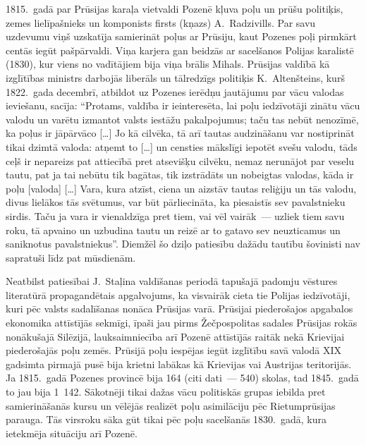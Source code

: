 \documentclass[twoside,a5paper,12pt,fleqn,openany]{extbook}
\newcommand{\citespace}{[\dots{}]}
\begin{document}
1815.~gadā par Prūsijas karaļa vietvaldi Pozenē kļuva poļu un prūšu politiķis, zemes lielīpašnieks un komponists firsts (kņazs) A.~Radzivills. Par savu uzdevumu viņš uzskatīja samierināt poļus ar Prūsiju, kaut Pozenes poļi pirmkārt centās iegūt pašpārvaldi. Viņa karjera gan beidzās ar sacelšanos Polijas karalistē (1830), kur viens no vadītājiem bija viņa brālis Mihals. Prūsijas valdībā kā izglītības ministrs darbojās liberāls un tālredzīgs politiķis K.~Altenšteins, kurš 1822.~gada decembrī, atbildot uz Pozenes ierēdņu jautājumu par vācu valodas ieviešanu, sacīja: ``Protams, valdība ir ieinteresēta, lai poļu iedzīvotāji zinātu vācu valodu un varētu izmantot valsts iestāžu pakalpojumus; taču tas nebūt nenozīmē, ka poļus ir jāpārvāco \citespace{} Jo kā cilvēka, tā arī tautas audzināšanu var nostiprināt tikai dzimtā valoda: atņemt to \citespace{} un censties mākslīgi iepotēt svešu valodu, tāds ceļš ir nepareizs pat attiecībā pret atsevišķu cilvēku, nemaz nerunājot par veselu tautu, pat ja tai nebūtu tik bagātas, tik izstrādāts un nobeigtas valodas, kāda ir poļu [valoda] \citespace{} Vara, kura atzīst, ciena un aizstāv tautas reliģiju un tās valodu, divus lielākos tās svētumus, var būt pārliecināta, ka piesaistīs sev pavalstnieku sirdis. Taču ja vara ir vienaldzīga pret tiem, vai vēl vairāk~--- uzliek tiem savu roku, tā apvaino un uzbudina tautu un reizē ar to gatavo sev neuzticamus un saniknotus pavalstniekus''. Diemžēl šo dziļo patiesību dažādu tautību šovinisti nav sapratuši līdz pat mūsdienām.

Neatbilst patiesībai J.~Staļina valdīšanas periodā tapušajā padomju vēstures literatūrā propagandētais apgalvojums, ka visvairāk cieta tie Polijas iedzīvotāji, kuri pēc valsts sadalīšanas nonāca Prūsijas varā. Prūsijai piederošajos apgabalos ekonomika attīstījās sekmīgi, īpaši jau pirms Žečpospolitas sadales Prūsijas rokās nonākušajā Silēzijā, lauksaimniecība arī Pozenē attīstījās raitāk nekā Krievijai piederošajās poļu zemēs. Prūsijā poļu iespējas iegūt izglītību savā valodā XIX gadsimta pirmajā pusē bija krietni labākas kā Krievijas vai Austrijas teritorijās. Ja 1815.~gadā Pozenes provincē bija 164 (citi dati~--- 540) skolas, tad 1845.~gadā to jau bija 1~142. Sākotnēji tikai dažas vācu politiskās grupas iebilda pret samierināšanās kursu un vēlējās realizēt poļu asimilāciju pēc Rietumprūsijas parauga. Tās virsroku sāka gūt tikai pēc poļu sacelšanās 1830.~gadā, kura ietekmēja situāciju arī Pozenē.
\end{document}
